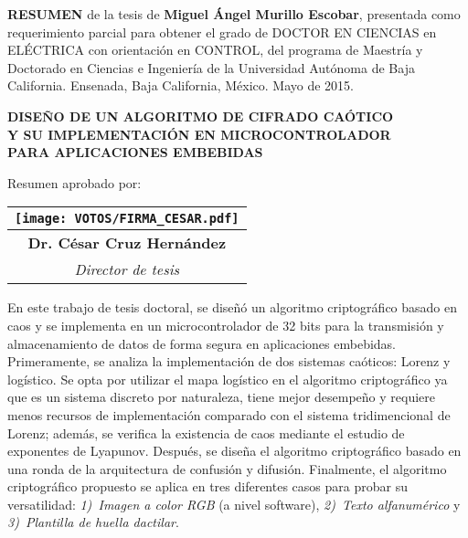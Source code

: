 
\newpage %



\textbf{RESUMEN} de la tesis de \textbf{Miguel Ángel Murillo Escobar}, presentada como requerimiento parcial para obtener el grado de DOCTOR EN CIENCIAS en ELÉCTRICA con orientación en CONTROL, del programa de Maestría y Doctorado en Ciencias e Ingeniería de la Universidad Autónoma de Baja California. Ensenada, Baja California, México. Mayo de 2015. \\

\begin{center}
  \textbf{DISEÑO DE UN ALGORITMO DE CIFRADO CAÓTICO \\Y SU IMPLEMENTACIÓN EN MICROCONTROLADOR \\PARA APLICACIONES EMBEBIDAS}
\end{center}  
 
Resumen aprobado por: 
\begin{flushright}
	\begin{tabular}{c}
	\texttt{[image: VOTOS/FIRMA\_CESAR.pdf]} \\
	\hline
	\textbf{Dr. César Cruz Hernández} \\
	\textit{Director de tesis}
	\end{tabular}
\end{flushright}

En este trabajo de tesis doctoral, se diseñó un algoritmo criptográfico basado en caos y se implementa en un microcontrolador de 32 bits para la transmisión y almacenamiento de datos de forma segura en aplicaciones embebidas. \\

Primeramente, se analiza la implementación de dos sistemas caóticos: Lorenz y logístico. Se opta por utilizar el mapa logístico en el algoritmo criptográfico ya que es un sistema discreto por naturaleza, tiene mejor desempeño y requiere menos recursos de implementación comparado con el sistema tridimencional de Lorenz; además, se verifica la existencia de caos mediante el estudio de exponentes de Lyapunov. Después, se diseña el algoritmo criptográfico basado en una ronda de la arquitectura de confusión y difusión. Finalmente, el algoritmo criptográfico propuesto se aplica en tres diferentes casos para probar su versatilidad: \textit{1)~Imagen a color RGB} (a nivel software), \textit{2)~Texto alfanumérico} y \textit{3)~Plantilla de huella dactilar}. \\  

